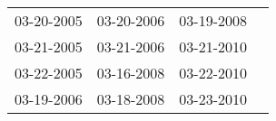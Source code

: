 \begin{supertabular}{llll}
 03-20-2005 &  03-20-2006 &  03-19-2008 \\
 03-21-2005 &  03-21-2006 &  03-21-2010 \\
 03-22-2005 &  03-16-2008 &  03-22-2010 \\
 03-19-2006 &  03-18-2008 &  03-23-2010 \\
\end{supertabular}
